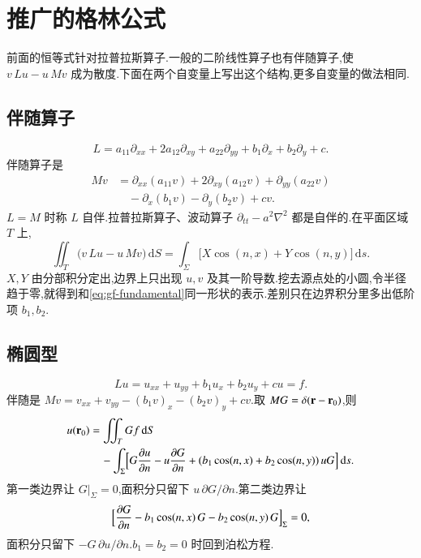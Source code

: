 \section{推广的格林公式}

前面的恒等式针对拉普拉斯算子.一般的二阶线性算子也有伴随算子,使 $v\,Lu-u\,Mv$ 成为散度.下面在两个自变量上写出这个结构,更多自变量的做法相同.

\subsection{伴随算子}
\begin{equation}
  L=a_{11}\partial_{xx}+2a_{12}\partial_{xy}+a_{22}\partial_{yy}
    +b_1\partial_x+b_2\partial_y+c.
\end{equation}
伴随算子是
\begin{equation}
\begin{aligned}
  Mv
  &=\partial_{xx}(a_{11}v)+2\partial_{xy}(a_{12}v)+\partial_{yy}(a_{22}v) \\
  &\quad-\partial_x(b_1 v)-\partial_y(b_2 v)+c v.
\end{aligned}
\end{equation}
$L=M$ 时称 $L$ 自伴.拉普拉斯算子、波动算子 $\partial_{tt}-a^2\nabla^2$ 都是自伴的.在平面区域 $T$ 上,
\begin{equation}
  \iint_{T}\bigl(v\,Lu-u\,Mv\bigr)\,\mathrm{d}S
  =\int_{\Sigma}\bigl[X\cos(n,x)+Y\cos(n,y)\bigr]\,\mathrm{d}s.
  \label{eq:gf-general}
\end{equation}
$X,Y$ 由分部积分定出,边界上只出现 $u,v$ 及其一阶导数.挖去源点处的小圆,令半径趋于零,就得到和\eqref{eq:gf-fundamental}同一形状的表示.差别只在边界积分里多出低阶项 $b_1,b_2$.

\subsection{椭圆型}
\begin{equation}
  Lu=u_{xx}+u_{yy}+b_1 u_x+b_2 u_y+c u=f.
\end{equation}
伴随是 $Mv=v_{xx}+v_{yy}-(b_1 v)_x-(b_2 v)_y+c v$.取 $MG=\delta({\mathbf{r}}-{\mathbf{r}}_0)$,则
\begin{equation}
\begin{aligned}
  u({\mathbf{r}}_0)
  &=\iint_{T} G f\,\mathrm{d}S \\
  &\quad-\int_{\Sigma}\Bigl[
      G\frac{\partial u}{\partial n}-u\frac{\partial G}{\partial n}
      +(b_1\cos(n,x)+b_2\cos(n,y))\,u G
    \Bigr]\,\mathrm{d}s.
\end{aligned}
\end{equation}
第一类边界让 $G|_{\Sigma}=0$,面积分只留下 $u\,\partial G/\partial n$.第二类边界让
\begin{equation}
  \Bigl[\frac{\partial G}{\partial n}
    -b_1\cos(n,x)\,G-b_2\cos(n,y)\,G\Bigr]_{\Sigma}=0,
\end{equation}
面积分只留下 $-G\,\partial u/\partial n$.$b_1=b_2=0$ 时回到泊松方程.

